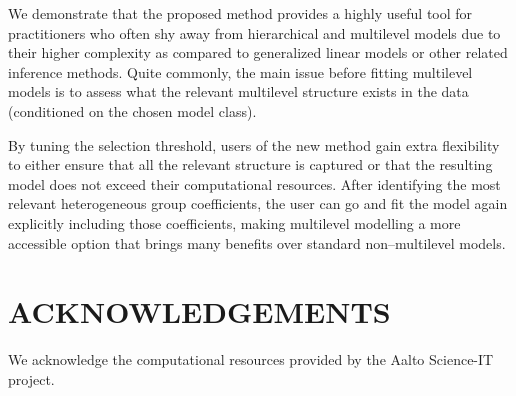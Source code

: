 \documentclass{article}
\begin{document}
We demonstrate that the proposed method provides a highly useful tool for practitioners who often shy away from hierarchical and multilevel models due to their higher complexity as compared to generalized linear models or other related inference methods.
Quite commonly, the main issue before fitting multilevel models is to assess what the relevant multilevel structure exists in the data (conditioned on the chosen model class).

By tuning the selection threshold, users of the new method gain extra flexibility to either ensure that all the relevant structure is captured or that the resulting model does not exceed their computational resources. 
After identifying the most relevant heterogeneous group coefficients, the user can go and fit the model again explicitly including those coefficients, making multilevel modelling a more accessible option that brings many benefits over standard non--multilevel models.

%
%
%
%

\section{ACKNOWLEDGEMENTS}

We acknowledge the computational resources provided by the Aalto Science-IT project.


%
%
%
%


\end{document}
